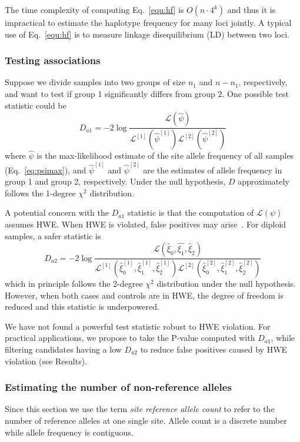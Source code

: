 \documentclass{bioinfo}
\begin{document}
\begin{methods}
The time complexity of computing Eq.~\eqref{equ:hf} is $O(n\cdot 4^k)$ and thus
it is impractical to estimate the haplotype frequency for many loci jointly.  A
typical use of Eq.~\eqref{equ:hf} is to measure linkage disequilibrium (LD)
between two loci.

\subsubsection{Testing associations}
Suppose we divide samples into two groups of size $n_1$ and $n-n_1$,
respectively, and want to test if group 1 significantly differs from group 2.
One possible test statistic could be~\citep{Kim:2010ve,Kim:2011fk}
\begin{equation}\label{eq:asso1}
D_{a1}=-2\log\frac{\mathcal{L}(\hat{\psi})}{\mathcal{L}^{[1]}(\hat{\psi}^{[1]})\mathcal{L}^{[2]}(\hat{\psi}^{[2]})}
\end{equation}
where $\hat{\psi}$ is the max-likelihood estimate of the site allele frequency
of all samples (Eq.~\ref{eq:psimax}), and $\hat{\psi}^{[1]}$ and
$\hat{\psi}^{[2]}$ are the estimates of allele frequency in group 1 and group
2, respectively.  Under the null hypothesis, $D$ approximately follows the
1-degree $\chi^2$ distribution.

A potential concern with the $D_{a1}$ statistic is that the computation of $\mathcal{L}(\psi)$
assumes HWE.  When HWE is violated, false positives may
arise~\citep{Nielsen:2011fk}. For diploid samples, a safer statistic is
\begin{equation}\label{eq:asso2}
D_{a2}=-2\log\frac{\mathcal{L}(\hat{\xi}_0,\hat{\xi_1},\hat{\xi}_2)}
{\mathcal{L}^{[1]}(\hat{\xi}_0^{[1]},\hat{\xi}_1^{[1]},\hat{\xi}_2^{[1]})\mathcal{L}^{[2]}(\hat{\xi}_0^{[2]},\hat{\xi}_1^{[2]},\hat{\xi}_2^{[2]})}
\end{equation}
which in principle follows the 2-degree $\chi^2$ distribution under the null
hypothesis.  However, when both cases and controls are in HWE, the degree of
freedom is reduced and this statistic is underpowered.

We have not found a powerful test statistic robust to HWE violation. For
practical applications, we propose to take the P-value computed with $D_{a1}$,
while filtering candidates having a low $D_{a2}$ to reduce false positives
caused by HWE violation (see Results).

\subsubsection{Estimating the number of non-reference alleles}
Since this section we use the term \emph{site reference allele count} to refer to
the number of reference alleles at one single site. Allele count is a discrete number
while allele frequency is contiguous.


\end{methods}
\end{document}
